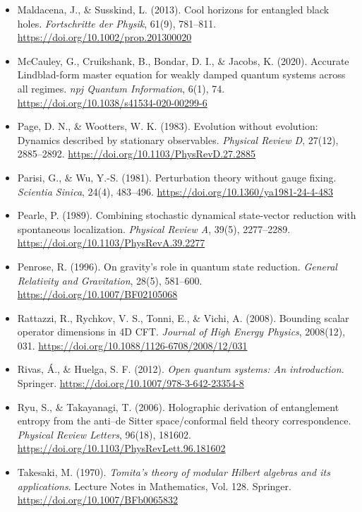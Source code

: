 \documentclass[12pt,a4paper]{article}
\numberwithin{equation}{section}
\begin{document}
\begin{itemize}[leftmargin=0.5in, itemindent=-0.5in, label={}]
\item Maldacena, J., \& Susskind, L. (2013). Cool horizons for entangled black holes. \textit{Fortschritte der Physik}, 61(9), 781--811. \url{https://doi.org/10.1002/prop.201300020}

\item McCauley, G., Cruikshank, B., Bondar, D. I., \& Jacobs, K. (2020). Accurate Lindblad-form master equation for weakly damped quantum systems across all regimes. \textit{npj Quantum Information}, 6(1), 74. \url{https://doi.org/10.1038/s41534-020-00299-6}

\item Page, D. N., \& Wootters, W. K. (1983). Evolution without evolution: Dynamics described by stationary observables. \textit{Physical Review D}, 27(12), 2885--2892. \url{https://doi.org/10.1103/PhysRevD.27.2885}

\item Parisi, G., \& Wu, Y.-S. (1981). Perturbation theory without gauge fixing. \textit{Scientia Sinica}, 24(4), 483--496. \url{https://doi.org/10.1360/ya1981-24-4-483}

\item Pearle, P. (1989). Combining stochastic dynamical state-vector reduction with spontaneous localization. \textit{Physical Review A}, 39(5), 2277--2289. \url{https://doi.org/10.1103/PhysRevA.39.2277}

\item Penrose, R. (1996). On gravity's role in quantum state reduction. \textit{General Relativity and Gravitation}, 28(5), 581--600. \url{https://doi.org/10.1007/BF02105068}

\item Rattazzi, R., Rychkov, V. S., Tonni, E., \& Vichi, A. (2008). Bounding scalar operator dimensions in 4D CFT. \textit{Journal of High Energy Physics}, 2008(12), 031. \url{https://doi.org/10.1088/1126-6708/2008/12/031}

\item Rivas, Á., \& Huelga, S. F. (2012). \textit{Open quantum systems: An introduction}. Springer. \url{https://doi.org/10.1007/978-3-642-23354-8}

\item Ryu, S., \& Takayanagi, T. (2006). Holographic derivation of entanglement entropy from the anti--de Sitter space/conformal field theory correspondence. \textit{Physical Review Letters}, 96(18), 181602. \url{https://doi.org/10.1103/PhysRevLett.96.181602}

\item Takesaki, M. (1970). \textit{Tomita's theory of modular Hilbert algebras and its applications}. Lecture Notes in Mathematics, Vol. 128. Springer. \url{https://doi.org/10.1007/BFb0065832}


\end{itemize}
\end{document}
